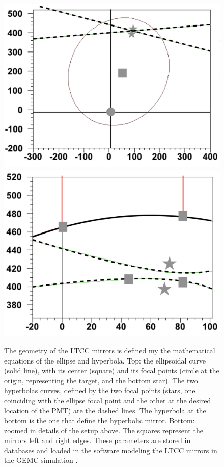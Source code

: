 \begin{figure}
	\centering
	\includegraphics[width=0.98\columnwidth,keepaspectratio]{img/mirrorMath1.png}
	\includegraphics[width=0.98\columnwidth,keepaspectratio]{img/mirrorMath2.png}
	\caption{The geometry of the LTCC mirrors is defined my the mathematical equations of the ellipse and hyperbola.
             Top: the ellipsoidal curve (solid line), with its center (square) and its focal points
             (circle at the origin, representing the target, and the bottom star).
             The two hyperbolas curves, defined by the two focal points (stars, one coinciding with the ellipse
			 focal point and the other at the desired location of the PMT) are the dashed lines. The
			 hyperbola at the bottom is the one that define the hyperbolic mirror.
             Bottom: zoomed in details of the setup above. The squares represent the mirrors left and right edges.
             These parameters are stored in databases and loaded in the software modeling the LTCC mirrors
             in the GEMC simulation \cite{gemc2019}.}
	\label{fig:mirrorMath}
\end{figure}

